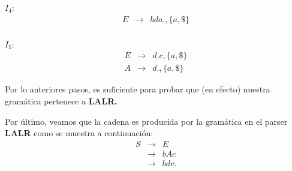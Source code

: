 $I_4$:
\begin{eqnarray*}
        E &\rightarrow& bda., \{a, \$\}\\
\end{eqnarray*}

$I_5$:
\begin{eqnarray*}
        E &\rightarrow& d.c, \{a, \$\}\\
        A &\rightarrow& d., \{a, \$\}
\end{eqnarray*}

Por lo anteriores pasos, es suficiente para probar que (en efecto)
nuestra gramática pertenece a \textbf{LALR.}\newline

Por último, veamos que la cadena  es producida por la gramática en el parser \textbf{LALR}
como se muestra a continuación:
\begin{eqnarray*}
        S &\rightarrow& E\\
          &\rightarrow& bAc\\
          &\rightarrow& bdc.\\
\end{eqnarray*}

